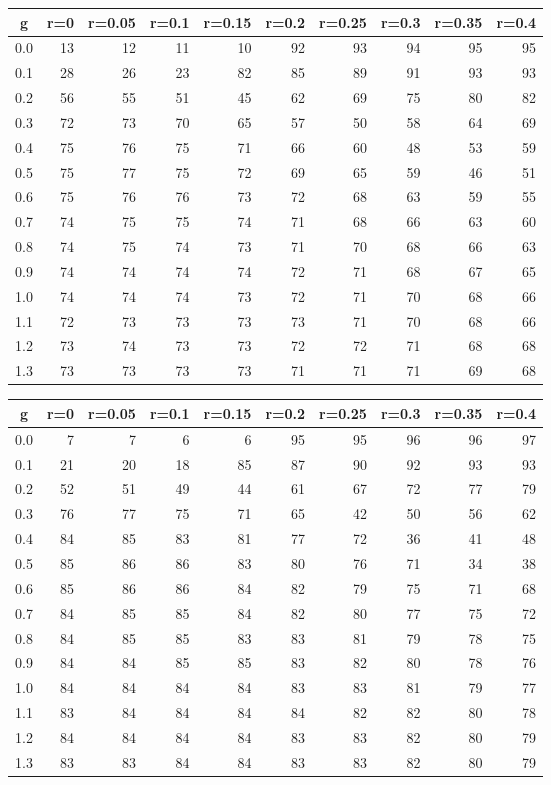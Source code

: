 %
\begin{table}[!tbp]
 \begin{center}
 \begin{tabular}{rrrrrrrrrr}\hline\hline
\multicolumn{1}{c}{g}&\multicolumn{1}{c}{r=0}&\multicolumn{1}{c}{r=0.05}&\multicolumn{1}{c}{r=0.1}&\multicolumn{1}{c}{r=0.15}&\multicolumn{1}{c}{r=0.2}&\multicolumn{1}{c}{r=0.25}&\multicolumn{1}{c}{r=0.3}&\multicolumn{1}{c}{r=0.35}&\multicolumn{1}{c}{r=0.4}\tabularnewline
\hline
0.0&13&12&11&10&92&93&94&95&95\tabularnewline
0.1&28&26&23&82&85&89&91&93&93\tabularnewline
0.2&56&55&51&45&62&69&75&80&82\tabularnewline
0.3&72&73&70&65&57&50&58&64&69\tabularnewline
0.4&75&76&75&71&66&60&48&53&59\tabularnewline
0.5&75&77&75&72&69&65&59&46&51\tabularnewline
0.6&75&76&76&73&72&68&63&59&55\tabularnewline
0.7&74&75&75&74&71&68&66&63&60\tabularnewline
0.8&74&75&74&73&71&70&68&66&63\tabularnewline
0.9&74&74&74&74&72&71&68&67&65\tabularnewline
1.0&74&74&74&73&72&71&70&68&66\tabularnewline
1.1&72&73&73&73&73&71&70&68&66\tabularnewline
1.2&73&74&73&73&72&72&71&68&68\tabularnewline
1.3&73&73&73&73&71&71&71&69&68\tabularnewline
\hline
\end{tabular}

\end{center}

\end{table}

%
\begin{table}[!tbp]
 \begin{center}
 \begin{tabular}{rrrrrrrrrr}\hline\hline
\multicolumn{1}{c}{g}&\multicolumn{1}{c}{r=0}&\multicolumn{1}{c}{r=0.05}&\multicolumn{1}{c}{r=0.1}&\multicolumn{1}{c}{r=0.15}&\multicolumn{1}{c}{r=0.2}&\multicolumn{1}{c}{r=0.25}&\multicolumn{1}{c}{r=0.3}&\multicolumn{1}{c}{r=0.35}&\multicolumn{1}{c}{r=0.4}\tabularnewline
\hline
0.0& 7& 7& 6& 6&95&95&96&96&97\tabularnewline
0.1&21&20&18&85&87&90&92&93&93\tabularnewline
0.2&52&51&49&44&61&67&72&77&79\tabularnewline
0.3&76&77&75&71&65&42&50&56&62\tabularnewline
0.4&84&85&83&81&77&72&36&41&48\tabularnewline
0.5&85&86&86&83&80&76&71&34&38\tabularnewline
0.6&85&86&86&84&82&79&75&71&68\tabularnewline
0.7&84&85&85&84&82&80&77&75&72\tabularnewline
0.8&84&85&85&83&83&81&79&78&75\tabularnewline
0.9&84&84&85&85&83&82&80&78&76\tabularnewline
1.0&84&84&84&84&83&83&81&79&77\tabularnewline
1.1&83&84&84&84&84&82&82&80&78\tabularnewline
1.2&84&84&84&84&83&83&82&80&79\tabularnewline
1.3&83&83&84&84&83&83&82&80&79\tabularnewline
\hline
\end{tabular}

\end{center}

\end{table}

